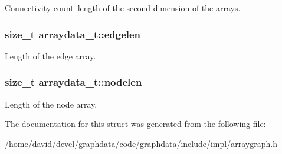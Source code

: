 Connectivity count--length of the second dimension of the arrays. 

\subsubsection[{\texorpdfstring{edgelen}{edgelen}}]{\setlength{\rightskip}{0pt plus 5cm}size\+\_\+t arraydata\+\_\+t\+::edgelen}\hypertarget{structarraydata__t_a1bcdcd2b541e02eb0d20be0563a1f447}{}\label{structarraydata__t_a1bcdcd2b541e02eb0d20be0563a1f447}


Length of the edge array. 

\subsubsection[{\texorpdfstring{nodelen}{nodelen}}]{\setlength{\rightskip}{0pt plus 5cm}size\+\_\+t arraydata\+\_\+t\+::nodelen}\hypertarget{structarraydata__t_ab7b4b6740dd5353c323233dea2e2eaee}{}\label{structarraydata__t_ab7b4b6740dd5353c323233dea2e2eaee}


Length of the node array. 



The documentation for this struct was generated from the following file\+:\begin{DoxyCompactItemize}
\item 
/home/david/devel/graphdata/code/graphdata/include/impl/\hyperlink{arraygraph_8h}{arraygraph.\+h}\end{DoxyCompactItemize}
